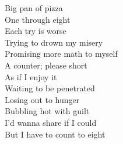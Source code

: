 Big pan of pizza\\
One through eight\\
Each try is worse\\
Trying to drown my misery\\
Promising more math to myself\\
A counter; please short\\
As if I enjoy it\\
Waiting to be penetrated\\
Losing out to hunger\\
Bubbling hot with guilt\\
I'd wanna share if I could\\
But I have to count to eight\\

